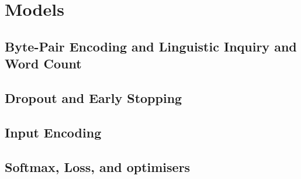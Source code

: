 \section{Models}\label{sec:model_background}
%
%
\subsection{Byte-Pair Encoding and Linguistic Inquiry and Word Count}


\subsection{Dropout and Early Stopping}\label{sec:dropoutearly}

\subsection{Input Encoding}

%
%
\subsection{Softmax, Loss, and optimisers}

